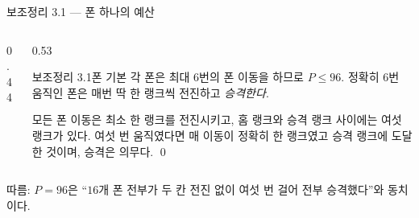 \documentclass[aspectratio=169,10pt]{beamer}
\begin{document}
\begin{frame}{보조정리 3.1 --- 폰 하나의 예산}
  \centering
  \vspace{0.2cm}
  \begin{columns}[c]
    \begin{column}{0.44\textwidth}\centering
      \figpawnfull
    \end{column}
    \begin{column}{0.53\textwidth}
      \begin{lcstate}{보조정리 3.1}{폰 기본}
        {\small 각 폰은 최대 $6$번의 폰 이동을 하므로 $P \le 96$.
        정확히 $6$번 움직인 폰은 매번 딱 한 랭크씩 전진하고 \emph{승격한다}.}
      \end{lcstate}
      \begin{lcproof}
        {\small 모든 폰 이동은 최소 한 랭크를 전진시키고, 홈 랭크와 승격
        랭크 사이에는 여섯 랭크가 있다. 여섯 번 움직였다면 매 이동이 정확히
        한 랭크였고 승격 랭크에 도달한 것이며, 승격은 의무다. \qed}
      \end{lcproof}
    \end{column}
  \end{columns}
  \par\vspace{0.25cm}
  {\small\color{lcaccent}
   따름: $P = 96$은 ``$16$개 폰 전부가 두 칸 전진 없이 여섯 번 걸어 전부
   승격했다''와 동치이다.}
\end{frame}
\end{document}
